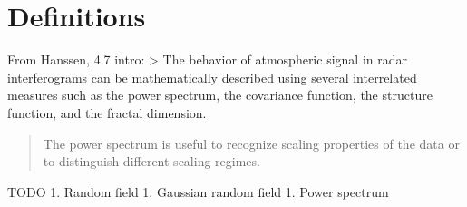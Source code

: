 \hypertarget{definitions}{%
\section{Definitions}\label{definitions}}

From Hanssen, 4.7 intro: \textgreater{} The behavior of atmospheric
signal in radar interferograms can be mathematically described using
several interrelated measures such as the power spectrum, the covariance
function, the structure function, and the fractal dimension.

\begin{quote}
The power spectrum is useful to recognize scaling properties of the data
or to distinguish different scaling regimes.
\end{quote}

TODO 1. Random field 1. Gaussian random field 1. Power spectrum
